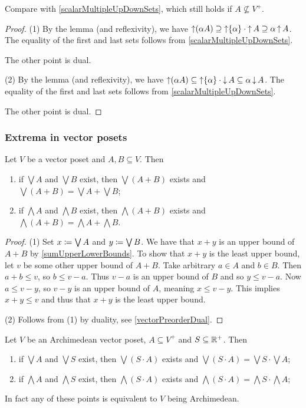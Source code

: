 Compare with \ref{scalarMultipleUpDownSets}, which still holds if $A \nsubseteq V^+$.
\begin{proof}
(1) By the lemma (and reflexivity), we have $\operatorname{\uparrow}(\alpha A) \supseteq \operatorname{\uparrow}\{\alpha\}\cdot \operatorname{\uparrow} A \supseteq \alpha \operatorname{\uparrow} A$. The equality of the first and last sets follows from \ref{scalarMultipleUpDownSets}.

The other point is dual.

(2) By the lemma (and reflexivity), we have $\operatorname{\uparrow}(\alpha A) \subseteq \operatorname{\uparrow}\{\alpha\}\cdot \operatorname{\downarrow} A \subseteq \alpha \operatorname{\downarrow} A$. The equality of the first and last sets follows from \ref{scalarMultipleUpDownSets}.

The other point is dual.
\end{proof}


\subsubsection{Extrema in vector posets}
\begin{lemma} \label{extremaVectorSum}
Let $V$ be a vector poset and $A,B\subseteq V$. Then
\begin{enumerate}
\item if $\bigvee A$ and $\bigvee B$ exist, then $\bigvee(A+B)$ exists and $\bigvee(A+B) = \bigvee A + \bigvee B$;
\item if $\bigwedge A$ and $\bigwedge B$ exist, then $\bigwedge(A+B)$ exists and $\bigwedge(A+B) = \bigwedge A + \bigwedge B$.
\end{enumerate}
\end{lemma}
\begin{proof}
(1) Set $x \coloneqq \bigvee A$ and $y \coloneqq \bigvee B$. We have that $x+y$ is an upper bound of $A+B$ by \ref{sumUpperLowerBounds}. To show that $x+y$ is the least upper bound, let $v$ be some other upper bound of $A+B$. Take arbitrary $a\in A$ and $b\in B$. Then $a+b \leq v$, so $b\leq v-a$. Thus $v-a$ is an upper bound of $B$ and so $y \leq v-a$. Now $a\leq v-y$, so $v-y$ is an upper bound of $A$, meaning $x \leq v-y$. This implies $x+y \leq v$ and thus that $x+y$ is the least upper bound.

(2) Follows from (1) by duality, see \ref{vectorPreorderDual}.
\end{proof}

\begin{lemma} \label{extremaScalarProduct}
Let $V$ be an Archimedean vector poset, $A\subseteq V^+$ and $S\subseteq \mathbb{R}^+$. Then
\begin{enumerate}
\item if $\bigvee A$ and $\bigvee S$ exist, then $\bigvee(S\cdot A)$ exists and $\bigvee(S\cdot A) = \bigvee S\cdot \bigvee A$;
\item if $\bigwedge A$ and $\bigwedge S$ exist, then $\bigwedge(S\cdot A)$ exists and $\bigwedge(S\cdot A) = \bigwedge S\cdot \bigwedge A$;
\end{enumerate}
\end{lemma}
In fact any of these points is equivalent to $V$ being Archimedean.


